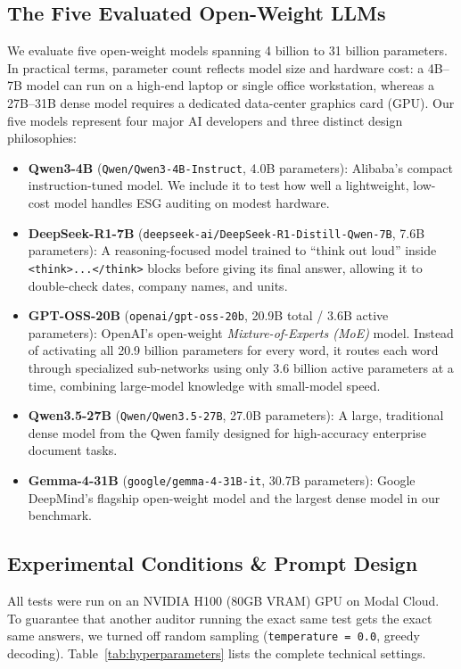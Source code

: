 \documentclass[11pt,letterpaper]{article}
\newcommand{\model}[1]{\textbf{#1}}
\begin{document}
\subsection{The Five Evaluated Open-Weight LLMs}
We evaluate five open-weight models spanning 4 billion to 31 billion parameters. In practical terms, parameter count reflects model size and hardware cost: a 4B--7B model can run on a high-end laptop or single office workstation, whereas a 27B--31B dense model requires a dedicated data-center graphics card (GPU). Our five models represent four major AI developers and three distinct design philosophies:
\begin{itemize}[leftmargin=1.5em, itemsep=2pt]
  \item \model{Qwen3-4B} (\texttt{Qwen/Qwen3-4B-Instruct}, 4.0B parameters): Alibaba's compact instruction-tuned model. We include it to test how well a lightweight, low-cost model handles ESG auditing on modest hardware.
  \item \model{DeepSeek-R1-7B} (\texttt{deepseek-ai/DeepSeek-R1-Distill-Qwen-7B}, 7.6B parameters): A reasoning-focused model trained to ``think out loud'' inside \texttt{<think>...</think>} blocks before giving its final answer, allowing it to double-check dates, company names, and units.
  \item \model{GPT-OSS-20B} (\texttt{openai/gpt-oss-20b}, 20.9B total / 3.6B active parameters): OpenAI's open-weight \textit{Mixture-of-Experts (MoE)} model. Instead of activating all 20.9 billion parameters for every word, it routes each word through specialized sub-networks using only 3.6 billion active parameters at a time, combining large-model knowledge with small-model speed.
  \item \model{Qwen3.5-27B} (\texttt{Qwen/Qwen3.5-27B}, 27.0B parameters): A large, traditional dense model from the Qwen family designed for high-accuracy enterprise document tasks.
  \item \model{Gemma-4-31B} (\texttt{google/gemma-4-31B-it}, 30.7B parameters): Google DeepMind's flagship open-weight model and the largest dense model in our benchmark.
\end{itemize}

\subsection{Experimental Conditions \& Prompt Design}
All tests were run on an NVIDIA H100 (80GB VRAM) GPU on Modal Cloud. To guarantee that another auditor running the exact same test gets the exact same answers, we turned off random sampling (\texttt{temperature = 0.0}, greedy decoding). Table~\ref{tab:hyperparameters} lists the complete technical settings.
\end{document}
